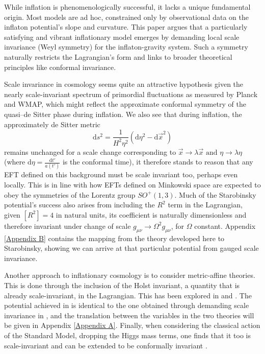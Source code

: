 \documentclass[aps,prd,reprint,preprintnumbers,showpacs,floatfix,nofootinbib,superscript address]{revtex4-2}
\begin{document}
While inflation is phenomenologically successful, it lacks a unique fundamental origin. Most models are ad hoc, constrained only by observational data on the inflaton potential’s slope and curvature. This paper argues that a particularly satisfying and vibrant inflationary model emerges by demanding local scale invariance (Weyl symmetry) for the inflaton-gravity system. Such a symmetry naturally restricts the Lagrangian’s form and links to broader theoretical principles like conformal invariance.

Scale invariance in cosmology seems quite an attractive hypothesis given the nearly scale-invariant spectrum of primordial fluctuations as measured by Planck and WMAP, which might reflect the approximate conformal symmetry of the quasi–de Sitter phase during inflation. We also see that during inflation, the approximately de Sitter metric
\begin{equation} \label{1}
    \text{d}s^2 = \frac{1}{H^2\eta^2}(\text{d}\eta^2 - \text{d}\Vec{x}^2)
\end{equation} 
remains unchanged for a scale change corresponding to $\Vec{x} \rightarrow \lambda \Vec{x} \,\, \text{and} \,\, \eta \rightarrow \lambda \eta$ (where $\text{d}\eta =  \frac{\text{d}t'}{a(t')}$ is the conformal time), it therefore stands to reason that any EFT defined on this background must be scale invariant too, perhaps even locally. This is in line with how EFTs defined on Minkowski space are expected to obey the symmetries of the Lorentz group $SO^+(1,3)$. Much of the Starobinsky potential's success also arises from including the $R^2$ term in the Lagrangian, given $[R^2] = 4$ in natural units, its coefficient is naturally dimensionless and therefore invariant under change of scale $g_{\mu\nu} \rightarrow \Omega^2 g_{\mu\nu}$, for $\Omega$ constant. Appendix \ref{Appendix B} contains the mapping from the theory developed here to Starobinsky, showing we can arrive at that particular potential from gauged scale invariance. 

Another approach to inflationary cosmology is to consider metric-affine theories. This is done through the inclusion of the Holst invariant, a quantity that is already scale-invariant, in the Lagrangian. This has been explored in \cite{Salvio_2022} and \cite{pradisi2022equivalence}. The potential achieved in \cite{Salvio_2022} is identical to the one obtained through demanding scale invariance in \cite{barker2024poincaregaugetheoryconformal}, and the translation between the variables in the two theories will be given in Appendix \ref{Appendix A}. Finally, when considering the classical action of the Standard Model, dropping the Higgs mass terms, one finds that it too is scale-invariant and can be extended to be conformally invariant \cite{bars2014local}.
\end{document}
